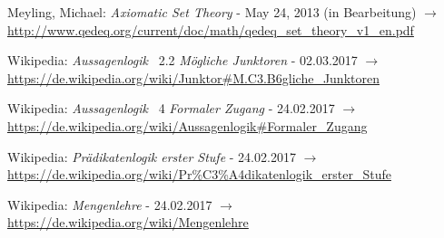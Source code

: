 \documentclass[english,ngerman,parskip=half,headsepline,footsepline]{scrreprt}
\begin{document}
\begin{flushleft}
\begin{thebibliography}{12}
			Meyling, Michael: \emph{Axiomatic Set Theory} - May 24, 2013 (in Bearbeitung) $\rightarrow$ \url{http://www.qedeq.org/current/doc/math/qedeq_set_theory_v1_en.pdf}

			Wikipedia: \emph{Aussagenlogik} \chaptername~2.2 \emph{Mögliche Junktoren} - 02.03.2017 $\rightarrow$ \url{https://de.wikipedia.org/wiki/Junktor#M.C3.B6gliche_Junktoren}

			Wikipedia: \emph{Aussagenlogik} \chaptername~4 \emph{Formaler Zugang} - 24.02.2017 $\rightarrow$ \url{https://de.wikipedia.org/wiki/Aussagenlogik#Formaler_Zugang}

			Wikipedia: \emph{Prädikatenlogik erster Stufe} - 24.02.2017  $\rightarrow$ \url{https://de.wikipedia.org/wiki/Pr%C3%A4dikatenlogik_erster_Stufe}

			Wikipedia: \emph{Mengenlehre} - 24.02.2017  $\rightarrow$ \url{https://de.wikipedia.org/wiki/Mengenlehre}

		\end{thebibliography}
	\end{flushleft}
	\thispagestyle{scrheadings}
\end{document}
